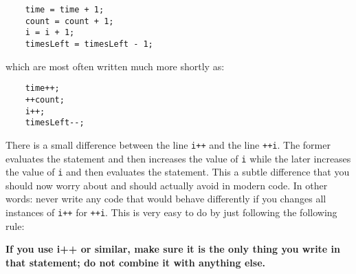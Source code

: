\begin{verbatim}
    time = time + 1;
    count = count + 1;
    i = i + 1;
    timesLeft = timesLeft - 1;
\end{verbatim}

which are most often written much more shortly as: 

\begin{verbatim}
    time++;
    ++count;
    i++;
    timesLeft--;
\end{verbatim}

There is a small difference between the line \verb-i++- and the line
\verb-++i-. The former evaluates the statement and then increases the
value of \verb+i+ while the later increases the value of \verb+i+ and
then evaluates the statement. This a subtle difference that you should
now worry about and should actually avoid in modern code. In other
words: never write any code that would behave differently if you
changes all instances of \verb-i++- for \verb-++i-. This is very easy
to do by just following the following rule: 

\begin{center}
  \vspace{1em}
  \textbf{\large If you use i++ or similar, make sure it is the only
  thing you write in that statement; do not combine it with anything else. }
  \vspace{1em}
\end{center}





